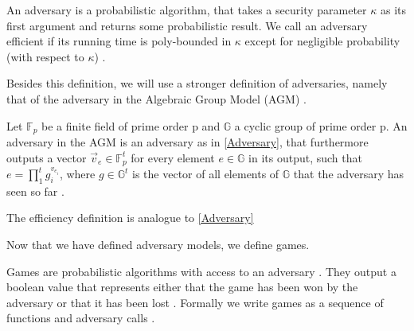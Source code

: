 \begin{definition}
    \label{Adversary}
An adversary is a probabilistic algorithm, that takes a security parameter $\kappa$ as its first argument and returns some probabilistic result. 
We call an adversary efficient if its running time is poly-bounded in $\kappa$ except for negligible probability (with respect to $\kappa$)
\parencite{boneh_shoup}.
\end{definition}

Besides this definition, we will use a stronger definition of adversaries, namely that of the adversary in the Algebraic Group Model (AGM) \parencite{AGM}.

\begin{definition}
    Let $\mathbb{F}_p$ be a finite field of prime order p and $\mathbb{G}$ a cyclic group of prime order p. An adversary in the AGM is an adversary as in \ref{Adversary}, that furthermore outputs a vector $\vec{v}_e \in \mathbb{F}_p^t$ for every element $e \in \mathbb{G}$ in its output, such that $e = \prod_{1}^{t} g_i^{v_{e_i}}$, where $g\in \mathbb{G}^t$ is the vector of all elements of $\mathbb{G}$ that the adversary has seen so far
    \parencite{AGM}. 

    The efficiency definition is analogue to \ref*{Adversary}
\end{definition}

Now that we have defined adversary models, we define games. 

\begin{definition}[games]
Games are probabilistic algorithms with access to an adversary \parencite*{boneh_shoup}. They output a boolean value that represents either that the game has been won by the adversary or that it has been lost \parencite{boneh_shoup}. Formally we write games as a sequence of functions and adversary calls \parencite{boneh_shoup}.
\end{definition}

